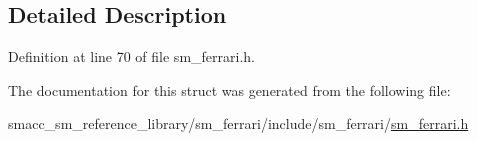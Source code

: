 \subsection{Detailed Description}


Definition at line 70 of file sm\+\_\+ferrari.\+h.



The documentation for this struct was generated from the following file\+:\begin{DoxyCompactItemize}
\item 
smacc\+\_\+sm\+\_\+reference\+\_\+library/sm\+\_\+ferrari/include/sm\+\_\+ferrari/\hyperlink{sm__ferrari_8h}{sm\+\_\+ferrari.\+h}\end{DoxyCompactItemize}
